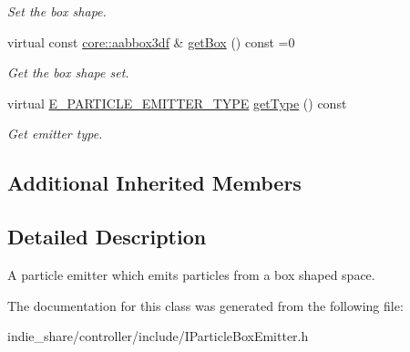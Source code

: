 \begin{DoxyCompactItemize}
\begin{DoxyCompactList}\small\item\em Set the box shape. \end{DoxyCompactList}\item 
\mbox{\label{classirr_1_1scene_1_1IParticleBoxEmitter_a06eaf3f090994cd4d5a8d52a63652504}} 
virtual const \hyperlink{namespaceirr_1_1core_a60f4b4c744aba55f10530d503c6ecb04}{core\+::aabbox3df} \& \hyperlink{classirr_1_1scene_1_1IParticleBoxEmitter_a06eaf3f090994cd4d5a8d52a63652504}{get\+Box} () const =0
\begin{DoxyCompactList}\small\item\em Get the box shape set. \end{DoxyCompactList}\item 
\mbox{\label{classirr_1_1scene_1_1IParticleBoxEmitter_a7072d42775bc75b9d5a08f26d39a27a0}} 
virtual \hyperlink{namespaceirr_1_1scene_a3e251a881c886884a78adea2e546272b}{E\+\_\+\+P\+A\+R\+T\+I\+C\+L\+E\+\_\+\+E\+M\+I\+T\+T\+E\+R\+\_\+\+T\+Y\+PE} \hyperlink{classirr_1_1scene_1_1IParticleBoxEmitter_a7072d42775bc75b9d5a08f26d39a27a0}{get\+Type} () const
\begin{DoxyCompactList}\small\item\em Get emitter type. \end{DoxyCompactList}\end{DoxyCompactItemize}
\subsection*{Additional Inherited Members}


\subsection{Detailed Description}
A particle emitter which emits particles from a box shaped space. 

The documentation for this class was generated from the following file\+:\begin{DoxyCompactItemize}
\item 
indie\+\_\+share/controller/include/I\+Particle\+Box\+Emitter.\+h\end{DoxyCompactItemize}
